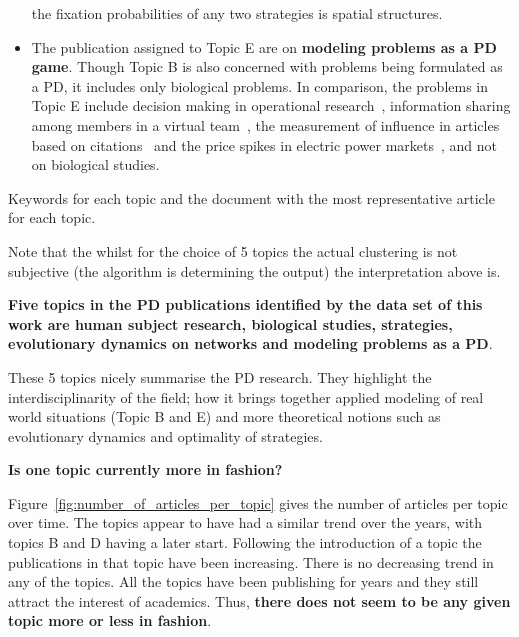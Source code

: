 \documentclass{article}
\theoremstyle{definition}
\begin{document}
\begin{itemize}
    the fixation probabilities of any two strategies is spatial
    structures.
    \item The publication assigned to Topic E are on \textbf{modeling problems
    as a PD game}. Though Topic B is also concerned with problems being formulated
    as a PD, it includes only biological problems. In comparison, the problems
    in Topic E include decision making in
    operational research~\cite{ormerod2010or}, information sharing among members
    in a virtual team~\cite{feng2008trilateral}, the measurement of influence
    in articles based on citations~\cite{hutchins2016relative} and the price
    spikes in electric power markets~\cite{Guan2002}, and not on biological studies.
\end{itemize}

\begin{table}[!hbtp]
    \begin{center}
    \resizebox{\textwidth}{!}{
    }
    \end{center}
    \caption{Keywords for each topic and the document with the most representative article for each topic.}
    \label{table:topics_and_articles}
\end{table}

Note that the whilst for the choice of 5 topics the actual clustering is not
subjective (the algorithm is determining the output) the interpretation above is.

\textbf{Five topics in the PD publications identified by the data set of this
work are human subject research, biological studies, strategies, evolutionary
dynamics on networks and modeling problems as a PD}.

These 5 topics nicely
summarise the PD research. They highlight the interdisciplinarity of the field;
how it brings together applied modeling of real world situations (Topic B and E)
and more theoretical notions such as evolutionary dynamics and optimality of
strategies.

\textbf{Is one topic currently more in fashion?}

Figure~\ref{fig:number_of_articles_per_topic} gives the number of articles
per topic over time. The topics appear to have had a similar trend over the years,
with topics B and D having a later start. Following the introduction of a topic
the publications in that topic have been increasing. There is no decreasing
trend in any of the topics. All the topics have been publishing for years and
they still attract the interest of academics. Thus, \textbf{there does not
seem to be any given topic more or less in fashion}.
\end{document}
